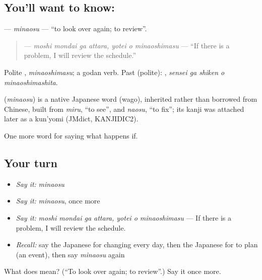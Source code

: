 \subsection*{You'll want to know: }
\textbf{} — \emph{minaosu} — \textquotedblleft{}to look over again; to review\textquotedblright{}.

\begin{quote}
\textbf{   } — \emph{moshi mondai ga attara, yotei o minaoshimasu} — \textquotedblleft{}If there is a problem, I will review the schedule.\textquotedblright{}
\end{quote}

Polite \textbf{}, \emph{minaoshimasu}; a godan verb. Past (polite): \textbf{  }, \emph{sensei ga shiken o minaoshimashita}.

\begin{cousinweb}
\textbf{} (\emph{minaosu}) is a native Japanese word (wago), inherited rather than borrowed from Chinese, built from \emph{miru}, \textquotedblleft{}to see\textquotedblright{}, and \emph{naosu}, \textquotedblleft{}to fix\textquotedblright{}; its kanji was attached later as a kun'yomi (JMdict, KANJIDIC2).
\end{cousinweb}

\begin{grammarlens}[title={What you've built}]
One more word for saying what happens if.
\end{grammarlens}

\subsection*{Your turn}
\begin{itemize}
\raggedright
  \item \emph{Say it:} \emph{minaosu}
  \item \emph{Say it:} \emph{minaosu}, once more
  \item \emph{Say it:} \emph{moshi mondai ga attara, yotei o minaoshimasu} — If there is a problem, I will review the schedule.
  \item \emph{Recall:} say the Japanese for changing every day, then the Japanese for to plan (an event), then say \emph{minaosu} again
\end{itemize}

\begin{tcolorbox}[breakable,colback=teal!4,colframe=teal!35!black,title={Before you move on}]
What does  mean? (\textquotedblleft{}To look over again; to review\textquotedblright{}.) Say it once more.
\end{tcolorbox}

